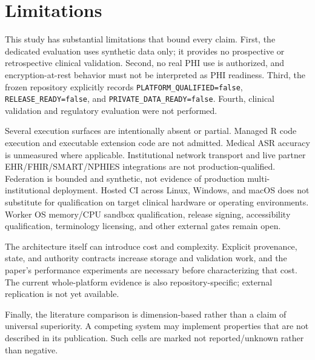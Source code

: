 \section{Limitations}

This study has substantial limitations that bound every claim. First, the dedicated evaluation uses synthetic data only; it provides no prospective or retrospective clinical validation. Second, no real PHI use is authorized, and encryption-at-rest behavior must not be interpreted as PHI readiness. Third, the frozen repository explicitly records \texttt{PLATFORM\_QUALIFIED=false}, \texttt{RELEASE\_READY=false}, and \texttt{PRIVATE\_DATA\_READY=false}. Fourth, clinical validation and regulatory evaluation were not performed.

Several execution surfaces are intentionally absent or partial. Managed R code execution and executable extension code are not admitted. Medical ASR accuracy is unmeasured where applicable. Institutional network transport and live partner EHR/FHIR/SMART/NPHIES integrations are not production-qualified. Federation is bounded and synthetic, not evidence of production multi-institutional deployment. Hosted CI across Linux, Windows, and macOS does not substitute for qualification on target clinical hardware or operating environments. Worker OS memory/CPU sandbox qualification, release signing, accessibility qualification, terminology licensing, and other external gates remain open.

The architecture itself can introduce cost and complexity. Explicit provenance, state, and authority contracts increase storage and validation work, and the paper's performance experiments are necessary before characterizing that cost. The current whole-platform evidence is also repository-specific; external replication is not yet available.

Finally, the literature comparison is dimension-based rather than a claim of universal superiority. A competing system may implement properties that are not described in its publication. Such cells are marked not reported/unknown rather than negative.
